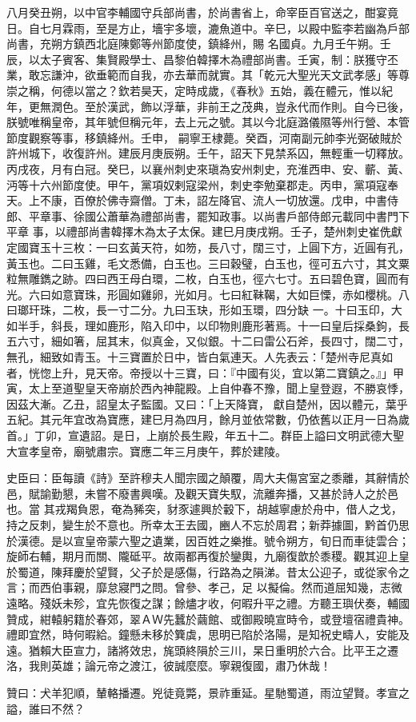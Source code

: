 \begin{pinyinscope}
 八月癸丑朔，以中官李輔國守兵部尚書，於尚書省上，命宰臣百官送之，酣宴竟日。自七月霖雨，至是方止，墻宇多壞，漉魚道中。辛巳，以殿中監李若幽為戶部尚書，充朔方鎮西北庭陳鄭等州節度使，鎮絳州，賜
 名國貞。九月壬午朔。壬辰，以太子賓客、集賢殿學士、昌黎伯韓擇木為禮部尚書。壬寅，制：朕獲守丕業，敢忘謙沖，欲垂範而自我，亦去華而就實。其「乾元大聖光天文武孝感」等尊崇之稱，何德以當之？欽若昊天，定時成歲，《春秋》五始，義在體元，惟以紀年，更無潤色。至於漢武，飾以浮華，非前王之茂典，豈永代而作則。自今已後，朕號唯稱皇帝，其年號但稱元年，去上元之號。其以今北庭潞儀隰等州行營、本管節度觀察等事，移鎮絳州。壬申，
 嗣寧王棣薨。癸酉，河南副元帥李光弼破賊於許州城下，收復許州。建辰月庚辰朔。壬午，詔天下見禁系囚，無輕重一切釋放。丙戌夜，月有白冠。癸巳，以襄州刺史來瑱為安州刺史，充淮西申、安、蘄、黃、沔等十六州節度使。甲午，黨項奴剌寇梁州，刺史李勉棄郡走。丙申，黨項寇奉天。上不康，百僚於佛寺齋僧。丁未，詔左降官、流人一切放還。戊申，中書侍郎、平章事、徐國公蕭華為禮部尚書，罷知政事。以尚書戶部侍郎元載同中書門下平章
 事，以禮部尚書韓擇木為太子太保。建巳月庚戌朔。壬子，楚州刺史崔侁獻定國寶玉十三枚：一曰玄黃天符，如笏，長八寸，闊三寸，上圓下方，近圓有孔，黃玉也。二曰玉雞，毛文悉備，白玉也。三曰穀璧，白玉也，徑可五六寸，其文粟粒無雕鐫之跡。四曰西王母白環，二枚，白玉也，徑六七寸。五曰碧色寶，圓而有光。六曰如意寶珠，形圓如雞卵，光如月。七曰紅靺鞨，大如巨慄，赤如櫻桃。八曰瑯玕珠，二枚，長一寸二分。九曰玉玦，形如玉環，四分缺
 一。十曰玉印，大如半手，斜長，理如鹿形，陷入印中，以印物則鹿形著焉。十一曰皇后採桑鉤，長五六寸，細如箸，屈其末，似真金，又似銀。十二曰雷公石斧，長四寸，闊二寸，無孔，細致如青玉。十三寶置於日中，皆白氣連天。人先表云：「楚州寺尼真如者，恍惚上升，見天帝。帝授以十三寶，曰：『中國有災，宜以第二寶鎮之。』」甲寅，太上至道聖皇天帝崩於西內神龍殿。上自仲春不豫，聞上皇登遐，不勝哀悸，因茲大漸。乙丑，詔皇太子監國。又曰：「上天降寶，
 獻自楚州，因以體元，葉乎五紀。其元年宜改為寶應，建巳月為四月，餘月並依常數，仍依舊以正月一日為歲首。」丁卯，宣遺詔。是日，上崩於長生殿，年五十二。群臣上謚曰文明武德大聖大宣孝皇帝，廟號肅宗。寶應二年三月庚午，葬於建陵。



 史臣曰：臣每讀《詩》至許穆夫人聞宗國之顛覆，周大夫傷宮室之黍離，其辭情於邑，賦諭勤懇，未嘗不廢書興嘆。及觀天寶失馭，流離奔播，又甚於詩人之於邑也。當
 其戎羯負恩，奄為豨突，豺豕遽興於轂下，胡越寧慮於舟中，借人之戈，持之反刺，變生於不意也。所幸太王去國，豳人不忘於周君；新莽據圖，黔首仍思於漢德。是以宣皇帝蒙六聖之遺業，因百姓之樂推。號令朔方，旬日而車徒雲合；旋師右輔，期月而關、隴砥平。故兩都再復於鑾輿，九廟復歆於黍稷。觀其迎上皇於蜀道，陳拜慶於望賢，父子於是感傷，行路為之隕涕。昔太公迎子，或從家令之言；而西伯事親，靡怠寢門之問。曾參、孝己，足
 以擬倫。然而道屈知幾，志微遠略。殘妖未殄，宜先恢復之謀；餘燼才收，何暇升平之禮。方聽王璵伏奏，輔國贊成，紺轅躬籍於春郊，翠ＡＷ先蠶於繭館、或御殿曉宣時令，或登壇宿禮貴神。禮即宜然，時何暇給。鐘懸未移於簨虡，思明已陷於洛陽，是知祝史疇人，安能及遠。猶賴大臣宣力，諸將效忠，旄頭終隕於三川，杲日重明於六合。比平王之遷洛，我則英雄；論元帝之渡江，彼誠麼麼。寧親復國，肅乃休哉！



 贊曰：犬羊犯順，輦輅播遷。兇徒竟斃，景祚重延。星馳蜀道，雨泣望賢。孝宣之謚，誰曰不然？



\end{pinyinscope}